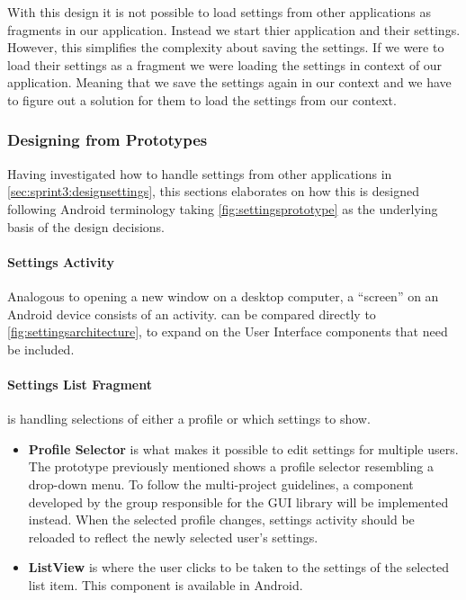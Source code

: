 With this design it is not possible to load settings from other applications as fragments in our application. Instead we start thier application and their settings.
However, this simplifies the complexity about saving the settings.
If we were to load their settings as a fragment we were loading the settings in context of our application. 
Meaning that we save the settings again in our context and we have to figure out a solution for them to load the settings from our context.

\subsubsection{Designing from Prototypes}
Having investigated how to handle settings from other \giraf applications in \cref{sec:sprint3:designsettings}, this sections elaborates on how this is designed following Android terminology taking \cref{fig:settingsprototype} as the underlying basis of the design decisions.

\paragraph{Settings Activity}
Analogous to opening a new window on a desktop computer, a ``screen'' on an Android device consists of an activity.
 can be compared directly to \cref{fig:settingsarchitecture}, to expand on the User Interface components that need be included.


\paragraph{Settings List Fragment} is handling selections of either a profile or which settings to show.

\begin{itemize}
\item \textbf{Profile Selector} is what makes it possible to edit settings for multiple users.
The prototype previously mentioned shows a profile selector resembling a drop-down menu.
To follow the multi-project guidelines, a component developed by the group responsible for the GUI library will be implemented instead.
When the selected profile changes, settings activity should be reloaded to reflect the newly selected user's settings.
\item \textbf{ListView} is where the user clicks to be taken to the settings of the selected list item.
This component is available in Android.
\end{itemize}

